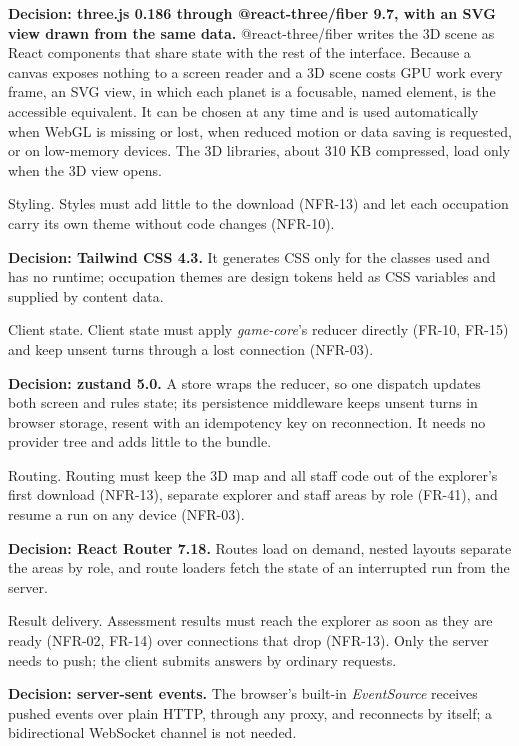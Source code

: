 \textbf{Decision: three.js 0.186 through @react-three/fiber 9.7, with an SVG view drawn from the same data.} @react-three/fiber writes the 3D scene as React components that share state with the rest of the interface\cite{r140}. Because a canvas exposes nothing to a screen reader and a 3D scene costs GPU work every frame\cite{r141}, an SVG view, in which each planet is a focusable, named element\cite{r142}, is the accessible equivalent. It can be chosen at any time and is used automatically when WebGL is missing or lost, when reduced motion or data saving is requested, or on low-memory devices. The 3D libraries, about 310 KB compressed, load only when the 3D view opens.

Styling. Styles must add little to the download (NFR-13) and let each occupation carry its own theme without code changes (NFR-10).

\textbf{Decision: Tailwind CSS 4.3.} It generates CSS only for the classes used and has no runtime\cite{r143}; occupation themes are design tokens held as CSS variables and supplied by content data.

Client state. Client state must apply \textit{game-core}'s reducer directly (FR-10, FR-15) and keep unsent turns through a lost connection (NFR-03).

\textbf{Decision: zustand 5.0.} A store wraps the reducer, so one dispatch updates both screen and rules state; its persistence middleware keeps unsent turns in browser storage, resent with an idempotency key on reconnection\cite{r144}. It needs no provider tree and adds little to the bundle.

Routing. Routing must keep the 3D map and all staff code out of the explorer's first download (NFR-13), separate explorer and staff areas by role (FR-41), and resume a run on any device (NFR-03).

\textbf{Decision: React Router 7.18.} Routes load on demand, nested layouts separate the areas by role, and route loaders fetch the state of an interrupted run from the server\cite{r145}.

Result delivery. Assessment results must reach the explorer as soon as they are ready (NFR-02, FR-14) over connections that drop (NFR-13). Only the server needs to push; the client submits answers by ordinary requests.

\textbf{Decision: server-sent events.} The browser's built-in \textit{EventSource} receives pushed events over plain HTTP, through any proxy, and reconnects by itself\cite{r146}; a bidirectional WebSocket channel is not needed.

